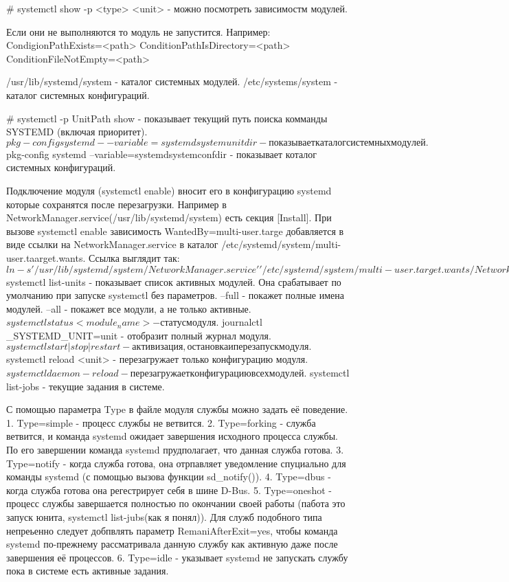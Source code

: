 # systemctl show -p <type> <unit> - можно посмотреть зависимостм модулей.

Если они не выполняются то модуль не запустится.
Например:
CondigionPathExists=<path>
ConditionPathIsDirectory=<path>
ConditionFileNotEmpty=<path>

/usr/lib/systemd/system - каталог системных модулей.
/etc/systems/system     - каталог системных конфигураций.

# systemctl -p UnitPath show - показывает текущий путь поиска комманды SYSTEMD
                               (включая приоритет).
$ pkg-config systemd --variable=systemdsystemunitdir - показывает каталог 
                                                       системных модулей.
$ pkg-config systemd --variable=systemdsystemconfdir - показывает коталог 
                                                       системных конфигураций.

Подключение модуля (systemctl enable) вносит его в конфигурацию systemd которые
сохранятся после перезагрузки.
Например в NetworkManager.service(/usr/lib/systemd/system) есть секция 
[Install]. При вызове systemctl enable зависимость 
WantedBy=multi-user.targe добавляется в виде ссылки на NetworkManager.service
в каталог /etc/systemd/system/multi-user.taarget.wants. Ссылка выглядит так:
$ ln -s '/usr/lib/systemd/system/NetworkManager.service' '/etc/systemd/system/mul
ti-user.target.wants/NetworkManager.service'

Активация модуля (systemctl start) лиш задействует его в текущем окружении 
пользователя.

$ systemctl list-units - показывает список активных модулей. Она срабатывает 
по умолчанию при запуске systemctl без параметров. --full - покажет полные 
имена модулей. --all - покажет все модули, а не только активные.
$ systemctl status <module_name> - статус модуля.
$ journalctl _SYSTEMD_UNIT=unit - отобразит полный журнал модуля.
$ systemctl start|stop|restart - активизация, остановка и перезапуск модуля.
$ systemctl reload <unit> - перезагружает только конфигурацию модуля.
$ systemctl daemon-reload - перезагружает конфигурацию всех модулей.
$ systemctl list-jobs - текущие задания в системе.


С помощью параметра Type в файле модуля службы можно задать её поведение.
1. Type=simple - процесс службы не ветвится.
2. Type=forking - служба ветвится, и команда systemd ожидает завершения
исходного процесса службы. По его завершении команда systemd прудполагает,
что данная служба готова.
3. Type=notify - когда служба готова, она отрпавляет уведомление спуциально для
команды systemd (с помощью вызова функции sd_notify()).
4. Type=dbus - когда служба готова она регестрирует себя в шине D-Bus.
5. Type=oneshot - процесс службы завершается полностью по окончании своей работы
(пабота это запуск юнита, systemctl list-jubs(как я понял)). Для служб 
подобного типа непреьенно следует добпвлять параметр RemaniAfterExit=yes, чтобы
команда systemd по-прежнему рассматривала данную службу как активную даже после
завершения её процессов.
6. Type=idle - указывает systemd не запускать службу пока в системе есть активные
задания.

